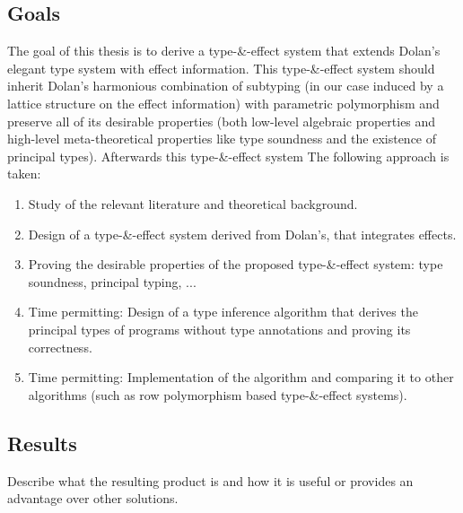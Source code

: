 \subsection{Goals}
The goal of this thesis is to derive a type-\&-effect system that extends Dolan's elegant type system with effect information. This type-\&-effect system should inherit Dolan's harmonious combination of subtyping (in our case induced by a lattice structure on the effect information) with parametric polymorphism and preserve all of its desirable properties (both low-level algebraic properties and high-level meta-theoretical properties like type soundness and the existence of principal types). Afterwards this type-\&-effect system The following approach is taken:
\begin{enumerate}
\item Study of the relevant literature and theoretical background.
\item Design of a type-\&-effect system derived from Dolan's, that integrates effects.
\item Proving the desirable properties of the proposed type-\&-effect system: type soundness, principal typing, ...
\item Time permitting: Design of a type inference algorithm that derives the principal types of programs without type annotations and proving its correctness.
\item Time permitting: Implementation of the algorithm and comparing it to other algorithms (such as row polymorphism based type-\&-effect systems).
\end{enumerate}

\subsection{Results}
Describe what the resulting product is and how it is useful or provides an advantage over other solutions.